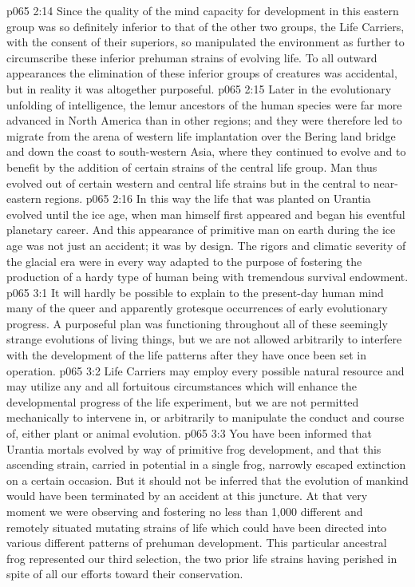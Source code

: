 \vs p065 2:14 Since the quality of the mind capacity for development in this eastern group was so definitely inferior to that of the other two groups, the Life Carriers, with the consent of their superiors, so manipulated the environment as further to circumscribe these inferior prehuman strains of evolving life. To all outward appearances the elimination of these inferior groups of creatures was accidental, but in reality it was altogether purposeful.
\vs p065 2:15 Later in the evolutionary unfolding of intelligence, the lemur ancestors of the human species were far more advanced in North America than in other regions; and they were therefore led to migrate from the arena of western life implantation over the Bering land bridge and down the coast to south\hyp{}western Asia, where they continued to evolve and to benefit by the addition of certain strains of the central life group. Man thus evolved out of certain western and central life strains but in the central to near\hyp{}eastern regions.
\vs p065 2:16 In this way the life that was planted on Urantia evolved until the ice age, when man himself first appeared and began his eventful planetary career. And this appearance of primitive man on earth during the ice age was not just an accident; it was by design. The rigors and climatic severity of the glacial era were in every way adapted to the purpose of fostering the production of a hardy type of human being with tremendous survival endowment.
\vs p065 3:1 It will hardly be possible to explain to the present\hyp{}day human mind many of the queer and apparently grotesque occurrences of early evolutionary progress. A purposeful plan was functioning throughout all of these seemingly strange evolutions of living things, but we are not allowed arbitrarily to interfere with the development of the life patterns after they have once been set in operation.
\vs p065 3:2 \pc Life Carriers may employ every possible natural resource and may utilize any and all fortuitous circumstances which will enhance the developmental progress of the life experiment, but we are not permitted mechanically to intervene in, or arbitrarily to manipulate the conduct and course of, either plant or animal evolution.
\vs p065 3:3 You have been informed that Urantia mortals evolved by way of primitive frog development, and that this ascending strain, carried in potential in a single frog, narrowly escaped extinction on a certain occasion. But it should not be inferred that the evolution of mankind would have been terminated by an accident at this juncture. At that very moment we were observing and fostering no less than 1,000 different and remotely situated mutating strains of life which could have been directed into various different patterns of prehuman development. This particular ancestral frog represented our third selection, the two prior life strains having perished in spite of all our efforts toward their conservation.
